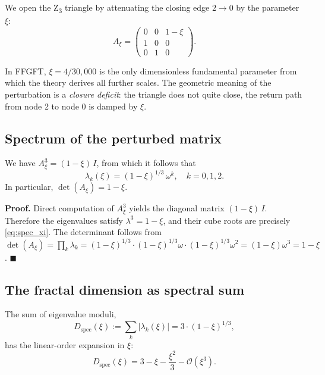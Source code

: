 We open the Z\textsubscript{3} triangle by attenuating the closing edge \(2 \to 0\) by the parameter \(\xi\):
\begin{equation}
A_\xi = \begin{pmatrix} 0 & 0 & 1 - \xi \\ 1 & 0 & 0 \\ 0 & 1 & 0 \end{pmatrix}.
\label{eq:Axi}
\end{equation}

In FFGFT, \(\xi = 4/30{,}000\) is the only dimensionless fundamental parameter from which the theory derives all further scales. The geometric meaning of the perturbation is a \emph{closure deficit}: the triangle does not quite close, the return path from node 2 to node 0 is damped by \(\xi\).

\subsection{Spectrum of the perturbed matrix}

\begin{foundation}
We have \(A_\xi^3 = (1 - \xi)\,I\), from which it follows that
\begin{equation}
\lambda_k(\xi) = (1 - \xi)^{1/3}\,\omega^k, \quad k = 0, 1, 2.
\label{eq:spec_xi}
\end{equation}
In particular, \(\det(A_\xi) = 1 - \xi\).
\end{foundation}

\noindent\textbf{Proof.} Direct computation of \(A_\xi^3\) yields the diagonal matrix \((1-\xi)\,I\). Therefore the eigenvalues satisfy \(\lambda^3 = 1 - \xi\), and their cube roots are precisely \eqref{eq:spec_xi}. The determinant follows from \(\det(A_\xi) = \prod_k \lambda_k = (1-\xi)^{1/3} \cdot (1-\xi)^{1/3} \omega \cdot (1-\xi)^{1/3} \omega^2 = (1-\xi) \omega^3 = 1 - \xi\). \(\blacksquare\)

\subsection{The fractal dimension as spectral sum}

The sum of eigenvalue moduli,
\begin{equation}
D_\text{spec}(\xi) := \sum_k |\lambda_k(\xi)| = 3 \cdot (1 - \xi)^{1/3},
\label{eq:Dspec}
\end{equation}
has the linear-order expansion in \(\xi\):
\begin{equation}
D_\text{spec}(\xi) = 3 - \xi - \frac{\xi^2}{3} - \mathcal{O}(\xi^3).
\label{eq:Dspec_taylor}
\end{equation}

